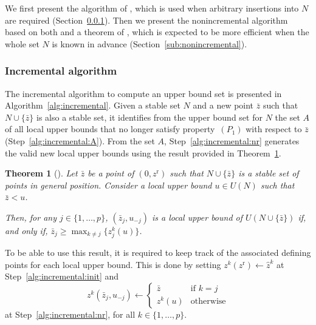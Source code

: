 \documentclass[a4paper,11pt]{article}
\newtheorem{theorem}[lemma]{Theorem}
\newcommand{\bz}{\bar{z}}
\newcommand{\BM}{z^{\text{r}}}
\newcommand{\Bzero}{0}
\newcommand{\dummy}{\hat{z}}
\newcommand{\lub}{local upper bound}
\begin{document}
We first present the algorithm of \citet{KlaLacVan15}, 
which is used
when arbitrary insertions into $N$ are required (Section~\ref{sub:incremental}). 
Then we present the nonincremental algorithm based on both \citet{KapRubShaVer08} and a theorem of \citet{KlaLacVan15},
which is expected to be more efficient when the whole set $N$ is known in advance
(Section~\ref{sub:nonincremental}).

\subsubsection{Incremental algorithm}\label{sub:incremental}

The incremental algorithm to compute an upper bound set is presented in Algorithm~\ref{alg:incremental}.
Given a stable set $N$ and a new point $\bz$ such that $N\cup \{\bz\}$ is also a stable set,
it identifies from the upper bound set for $N$ the set $A$ of all local upper bounds
that no longer satisfy property~$(P_1)$ with respect to $\bz$ (Step~\ref{alg:incremental:A}).
From the set $A$, Step~\ref{alg:incremental:nr} generates the valid new local upper bounds 
using the result provided in Theorem~\ref{th:incremental}. 


\begin{theorem}[\citealp{KlaLacVan15}]\label{th:incremental}
  Let $\bz$ be a point of $(\Bzero, \BM)$ such that $N\cup\{\bz\}$ 
  is a stable set of points in general position. 
  Consider a \lub{} $u\in U(N)$ such that $\bz < u$.
  
  Then, for any $j \in \{1,\dots,p\}$, $({\bz}_j,u_{-j})$ 
  is a \lub{} of $U({N}\cup \{\bz\})$ 
  if, and only if, $\bz_j \geq \max_{k\neq j} \{z_j^{k}(u)\}$.
\end{theorem}

To be able to use this result, it is required to keep track of the associated defining points for each local upper bound. 
This is done by setting $z^k(\BM) \leftarrow \dummy^k$ 
at Step~\ref{alg:incremental:init}
and 
$$z^k(\bz_j, u_{-j}) \leftarrow 
\begin{cases}
  \bz    & \text{if $k = j$}\\
  z^k(u) & \text{otherwise}
\end{cases}
$$
at Step~\ref{alg:incremental:nr},
for all $k \in \{1, \dots, p\}$.
\end{document}
